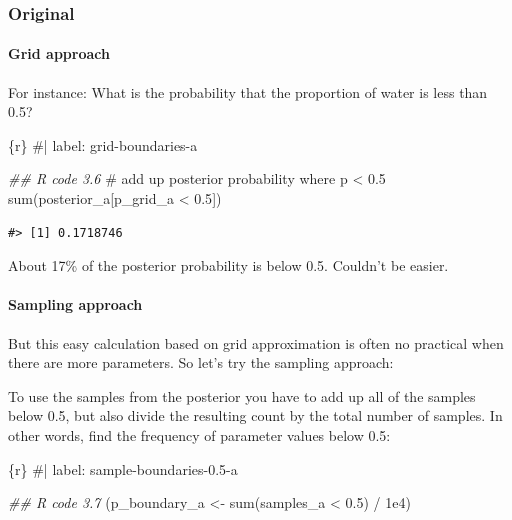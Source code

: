 \documentclass[
  letterpaper,
  DIV=11,
  numbers=noendperiod]{scrreprt}
\let\oldparagraph\paragraph
\renewcommand{\paragraph}[1]{\oldparagraph{#1}\mbox{}}
\newenvironment{Shaded}{\begin{snugshade}}{\end{snugshade}}
\newcommand{\CommentTok}[1]{\textcolor[rgb]{0.37,0.37,0.37}{#1}}
\newcommand{\DocumentationTok}[1]{\textcolor[rgb]{0.37,0.37,0.37}{\textit{#1}}}
\newcommand{\FloatTok}[1]{\textcolor[rgb]{0.68,0.00,0.00}{#1}}
\newcommand{\FunctionTok}[1]{\textcolor[rgb]{0.28,0.35,0.67}{#1}}
\newcommand{\InformationTok}[1]{\textcolor[rgb]{0.37,0.37,0.37}{#1}}
\newcommand{\NormalTok}[1]{\textcolor[rgb]{0.00,0.23,0.31}{#1}}
\newcommand{\OtherTok}[1]{\textcolor[rgb]{0.00,0.23,0.31}{#1}}
\newcommand{\SpecialCharTok}[1]{\textcolor[rgb]{0.37,0.37,0.37}{#1}}
\begin{document}
\hypertarget{original-11}{%
\subsubsection{Original}\label{original-11}}

\hypertarget{grid-approach}{%
\paragraph{Grid approach}\label{grid-approach}}

For instance: What is the probability that the proportion of water is
less than 0.5?

\begin{Shaded}
\begin{Highlighting}[]
\InformationTok{\textasciigrave{}\textasciigrave{}\textasciigrave{}\{r\}}
\CommentTok{\#| label: grid{-}boundaries{-}a}

\DocumentationTok{\#\# R code 3.6}
\CommentTok{\# add up posterior probability where p \textless{} 0.5}
\FunctionTok{sum}\NormalTok{(posterior\_a[p\_grid\_a }\SpecialCharTok{\textless{}} \FloatTok{0.5}\NormalTok{])}
\InformationTok{\textasciigrave{}\textasciigrave{}\textasciigrave{}}
\end{Highlighting}
\end{Shaded}

\begin{verbatim}
#> [1] 0.1718746
\end{verbatim}

About 17\% of the posterior probability is below 0.5. Couldn't be
easier.

\hypertarget{sampling-approach}{%
\paragraph{Sampling approach}\label{sampling-approach}}

But this easy calculation based on grid approximation is often no
practical when there are more parameters. So let's try the sampling
approach:

To use the samples from the posterior you have to add up all of the
samples below 0.5, but also divide the resulting count by the total
number of samples. In other words, find the frequency of parameter
values below 0.5:

\begin{Shaded}
\begin{Highlighting}[]
\InformationTok{\textasciigrave{}\textasciigrave{}\textasciigrave{}\{r\}}
\CommentTok{\#| label: sample{-}boundaries{-}0.5{-}a}

\DocumentationTok{\#\# R code 3.7}
\NormalTok{(p\_boundary\_a }\OtherTok{\textless{}{-}} \FunctionTok{sum}\NormalTok{(samples\_a }\SpecialCharTok{\textless{}} \FloatTok{0.5}\NormalTok{) }\SpecialCharTok{/} \FloatTok{1e4}\NormalTok{)}
\InformationTok{\textasciigrave{}\textasciigrave{}\textasciigrave{}}
\end{Highlighting}
\end{Shaded}
\end{document}
